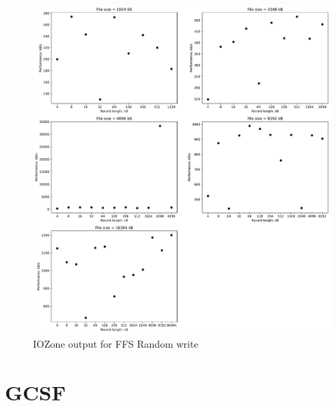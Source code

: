 \begin{figure}[!htb]
	\label{fig:app_bench_ffs_rnd_write}
	\begin{center}
		\includegraphics[width=1.0\textwidth]{figures/benchmarking/ffs/Random write.pdf}
	\end{center}
	\caption{IOZone output for \gls{FFS} Random write}
\end{figure}

\section{GCSF}








